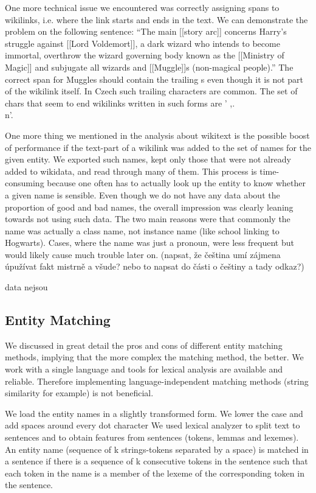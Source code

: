 One more technical issue we encountered was correctly assigning spans to wikilinks, i.e. where the link starts and ends in the text. We can demonstrate the problem on the following sentence: “The main [[story arc]] concerns Harry's struggle against [[Lord Voldemort]], a dark wizard who intends to become immortal, overthrow the wizard governing body known as the [[Ministry of Magic]] and subjugate all wizards and [[Muggle]]s (non-magical people).” The correct span for Muggles should contain the trailing s even though it is not part of the wikilink itself. In Czech such trailing characters are common. The set of chars that seem to end wikilinks written in such forms are ' ,.\\n'. 

One more thing we mentioned in the analysis about wikitext is the possible boost of performance if the text-part of a wikilink was added to the set of names for the given entity. We exported such names, kept only those that were not already added to wikidata, and read through many of them. This process is time-consuming because one often has to actually look up the entity to know whether a given name is sensible. Even though we do not have any data about the proportion of good and bad names, the overall impression was clearly leaning towards not using such data. The two main reasons were that commonly the name was actually a class name, not instance name (like school linking to Hogwarts). Cases, where the name was just a pronoun, were less frequent but would likely cause much trouble later on. (napsat, že čeština umí zájmena úpužívat fakt mistrně a všude? nebo to napsat do části o češtiny a tady odkaz?)


 data nejsou

\subsection{Entity Matching}
We discussed in great detail the pros and cons of different entity matching methods, implying that the more complex the matching method, the better. We work with a single language and tools for lexical analysis are available and reliable. Therefore implementing language-independent matching methods (string similarity for example) is not beneficial. 

We load the entity names in a slightly transformed form. We lower the case and add spaces around every dot character We used lexical analyzer to split text to sentences and to obtain features from sentences (tokens, lemmas and lexemes). An entity name (sequence of k strings-tokens separated by a space) is matched in a sentence  if there is a sequence of k consecutive tokens in the sentence such that each token in the name is a member of the lexeme of the corresponding token in the sentence. 

